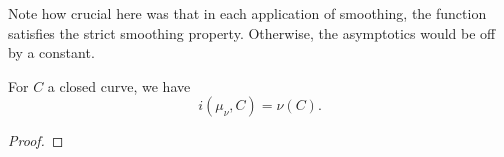 \begin{remark}
Note how crucial here was that in each application of smoothing, the function satisfies the strict smoothing property. Otherwise, the asymptotics would be off by a constant.
\end{remark}

\begin{proposition}\label{prop:liouvillecurrent}
For $C$ a closed curve, we have
\[
i(\mu_{\nu},C)=\nu(C).
\]
\end{proposition}
\begin{proof}

\end{proof}
